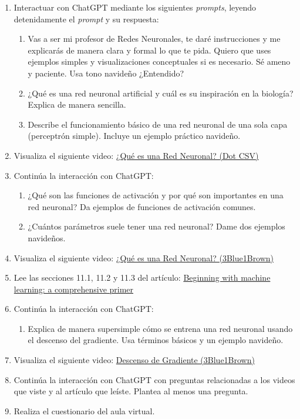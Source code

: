 \documentclass[a4,11pt]{aleph-notas}
\begin{document}
\begin{enumerate}[leftmargin=*]
    \item Interactuar con ChatGPT mediante los siguientes \textit{prompts}, leyendo detenidamente el \textit{prompt} y su respuesta:
    \begin{enumerate}[label=\textit{Prompt \arabic*.},leftmargin=2.1cm]
        \item Vas a ser mi profesor de Redes Neuronales, te daré instrucciones y me explicarás de manera clara y formal lo que te pida. Quiero que uses ejemplos simples y visualizaciones conceptuales si es necesario. Sé ameno y paciente. Usa tono navideño ¿Entendido?
        \item ¿Qué es una red neuronal artificial y cuál es su inspiración en la biología? Explica de manera sencilla.
        \item Describe el funcionamiento básico de una red neuronal de una sola capa (perceptrón simple). Incluye un ejemplo práctico navideño.
    \end{enumerate}
    \item Visualiza el siguiente video: \href{https://youtu.be/MRIv2IwFTPg?si=6ocz4bs1Wi5SkeSz}{¿Qué es una Red Neuronal? (Dot CSV)}
    \item Continúa la interacción con ChatGPT:
    \begin{enumerate}[label=\textit{Prompt \arabic*.},leftmargin=2.1cm, start=4]
        \item ¿Qué son las funciones de activación y por qué son importantes en una red neuronal? Da ejemplos de funciones de activación comunes.
        \item ¿Cuántos parámetros suele tener una red neuronal? Dame dos ejemplos navideños.
    \end{enumerate}
    \item Visualiza el siguiente video: \href{https://youtu.be/jKCQsndqEGQ?si=2hLeG20lU4I5ff44}{¿Qué es una Red Neuronal? (3Blue1Brown)}
    \item Lee las secciones 11.1, 11.2 y 11.3 del artículo: \href{https://link.springer.com/article/10.1140/epjs/s11734-021-00209-7}{Beginning with machine learning: a comprehensive primer}
    \item Continúa la interacción con ChatGPT:
    \begin{enumerate}[label=\textit{Prompt \arabic*.},leftmargin=2.1cm, start=6]
        \item Explica de manera supersimple cómo se entrena una red neuronal usando el descenso del gradiente. Usa términos básicos y un ejemplo navideño.
    \end{enumerate}
    \item Visualiza el siguiente video: \href{https://youtu.be/mwHiaTrQOiI?si=f-0Y43MwfJ-Q3Af7}{Descenso de Gradiente (3Blue1Brown)}
    \item Continúa la interacción con ChatGPT con preguntas relacionadas a los videos que viste y al artículo que leíste. Plantea al menos una pregunta.
    \item Realiza el cuestionario del aula virtual.
\end{enumerate}
\end{document}
